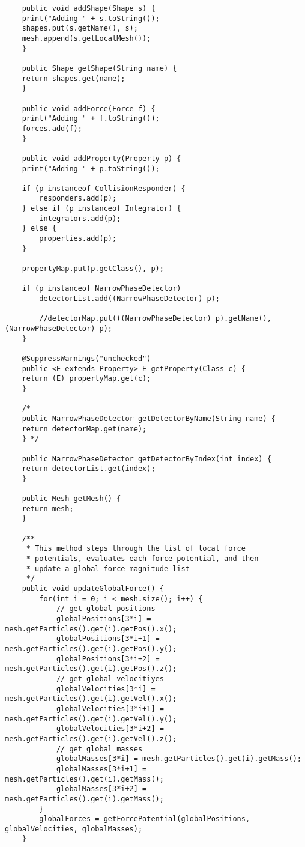 \begin{lstlisting}
    public void addShape(Shape s) {
	print("Adding " + s.toString());
	shapes.put(s.getName(), s);
	mesh.append(s.getLocalMesh());
    }

    public Shape getShape(String name) {
	return shapes.get(name);
    }

    public void addForce(Force f) {
	print("Adding " + f.toString());
	forces.add(f);
    }
	
    public void addProperty(Property p) {
	print("Adding " + p.toString());

	if (p instanceof CollisionResponder) {
	    responders.add(p);
	} else if (p instanceof Integrator) {
	    integrators.add(p);
	} else {
	    properties.add(p);
	}

	propertyMap.put(p.getClass(), p);

	if (p instanceof NarrowPhaseDetector)
	    detectorList.add((NarrowPhaseDetector) p);

	    //detectorMap.put(((NarrowPhaseDetector) p).getName(), (NarrowPhaseDetector) p);
    }

    @SuppressWarnings("unchecked")
    public <E extends Property> E getProperty(Class c) {
	return (E) propertyMap.get(c);
    }
    
    /*
    public NarrowPhaseDetector getDetectorByName(String name) {
	return detectorMap.get(name);
	} */

    public NarrowPhaseDetector getDetectorByIndex(int index) {
	return detectorList.get(index);
    }
	
    public Mesh getMesh() {
	return mesh;
    }

	/**
     * This method steps through the list of local force 
     * potentials, evaluates each force potential, and then 
     * update a global force magnitude list 
     */	
	public void updateGlobalForce() {
		for(int i = 0; i < mesh.size(); i++) {
			// get global positions
			globalPositions[3*i] = mesh.getParticles().get(i).getPos().x();
			globalPositions[3*i+1] = mesh.getParticles().get(i).getPos().y();
			globalPositions[3*i+2] = mesh.getParticles().get(i).getPos().z();
			// get global velocitiyes
			globalVelocities[3*i] = mesh.getParticles().get(i).getVel().x();
			globalVelocities[3*i+1] = mesh.getParticles().get(i).getVel().y();
			globalVelocities[3*i+2] = mesh.getParticles().get(i).getVel().z();
			// get global masses
			globalMasses[3*i] = mesh.getParticles().get(i).getMass();
			globalMasses[3*i+1] = mesh.getParticles().get(i).getMass();
			globalMasses[3*i+2] = mesh.getParticles().get(i).getMass();
		}		
		globalForces = getForcePotential(globalPositions, globalVelocities, globalMasses);
	}
	

\end{lstlisting}

